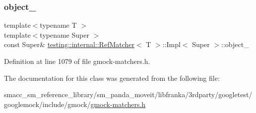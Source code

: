 \subsubsection{\texorpdfstring{object\+\_\+}{object\_}}
{\footnotesize\ttfamily template$<$typename T $>$ \\
template$<$typename Super $>$ \\
const Super\& \hyperlink{classtesting_1_1internal_1_1RefMatcher}{testing\+::internal\+::\+Ref\+Matcher}$<$ T $>$\+::Impl$<$ Super $>$\+::object\+\_\+\hspace{0.3cm}{\ttfamily [private]}}



Definition at line 1079 of file gmock-\/matchers.\+h.



The documentation for this class was generated from the following file\+:\begin{DoxyCompactItemize}
\item 
smacc\+\_\+sm\+\_\+reference\+\_\+library/sm\+\_\+panda\+\_\+moveit/libfranka/3rdparty/googletest/googlemock/include/gmock/\hyperlink{gmock-matchers_8h}{gmock-\/matchers.\+h}\end{DoxyCompactItemize}
